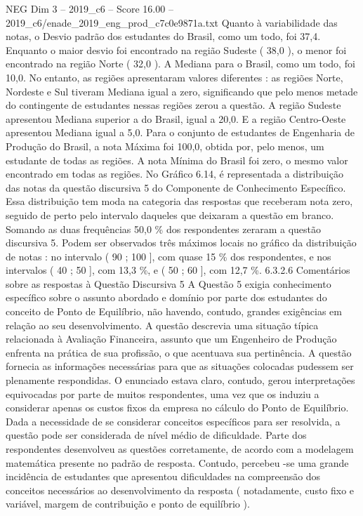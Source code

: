 \begin{textsample}{NEG Dim 3 – 2019\_c6 – Score 16.00 – 2019\_c6/enade\_2019\_eng\_prod\_c7c0e9871a.txt}
Quanto à variabilidade das notas, o Desvio padrão dos estudantes do Brasil, como um todo, foi 37,4.
Enquanto o maior desvio foi encontrado na região Sudeste ( 38,0 ), o menor foi encontrado na região Norte ( 32,0 ).
A Mediana para o Brasil, como um todo, foi 10,0.
No entanto, as regiões apresentaram valores diferentes : as regiões Norte, Nordeste e Sul tiveram Mediana igual a zero, significando que pelo menos metade do contingente de estudantes nessas regiões zerou a questão.
A região Sudeste apresentou Mediana superior a do Brasil, igual a 20,0.
E a região Centro-Oeste apresentou Mediana igual a 5,0.
Para o conjunto de estudantes de Engenharia de Produção do Brasil, a nota Máxima foi 100,0, obtida por, pelo menos, um estudante de todas as regiões.
A nota Mínima do Brasil foi zero, o mesmo valor encontrado em todas as regiões.
No Gráfico 6.14, é representada a distribuição das notas da questão discursiva 5 do Componente de Conhecimento Específico.
Essa distribuição tem moda na categoria das respostas que receberam nota zero, seguido de perto pelo intervalo daqueles que deixaram a questão em branco.
Somando as duas frequências 50,0 \% dos respondentes zeraram a questão discursiva 5.
Podem ser observados três máximos locais no gráfico da distribuição de notas : no intervalo ( 90 ; 100 ], com quase 15 \% dos respondentes, e nos intervalos ( 40 ; 50 ], com 13,3 \%, e ( 50 ; 60 ], com 12,7 \%. 6.3.2.6 Comentários sobre as respostas à Questão Discursiva 5 A Questão 5 exigia conhecimento específico sobre o assunto abordado e domínio por parte dos estudantes do conceito de Ponto de Equilíbrio, não havendo, contudo, grandes exigências em relação ao seu desenvolvimento.
A questão descrevia uma situação típica relacionada à Avaliação Financeira, assunto que um Engenheiro de Produção enfrenta na prática de sua profissão, o que acentuava sua pertinência.
A questão fornecia as informações necessárias para que as situações colocadas pudessem ser plenamente respondidas.
O enunciado estava claro, contudo, gerou interpretações equivocadas por parte de muitos respondentes, uma vez que os induziu a considerar apenas os custos fixos da empresa no cálculo do Ponto de Equilíbrio.
Dada a necessidade de se considerar conceitos específicos para ser resolvida, a questão pode ser considerada de nível médio de dificuldade.
Parte dos respondentes desenvolveu as questões corretamente, de acordo com a modelagem matemática presente no padrão de resposta.
Contudo, percebeu -se uma grande incidência de estudantes que apresentou dificuldades na compreensão dos conceitos necessários ao desenvolvimento da resposta ( notadamente, custo fixo e variável, margem de contribuição e ponto de equilíbrio ).

\end{textsample}
